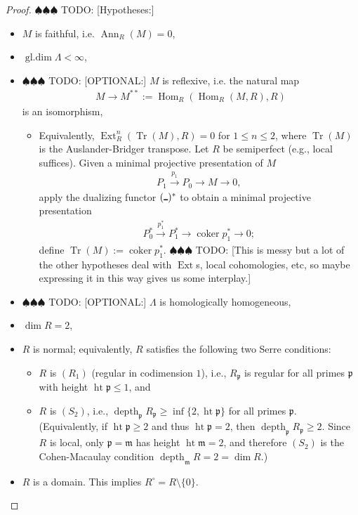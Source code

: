 \documentclass{amsart}
\theoremstyle{definition}
\def\xra{\xrightarrow}
\def\Arg{\rule{1ex}{1pt}}
\def\fm{\mathfrak{m}}
\def\fp{\mathfrak{p}}
\DeclareMathOperator{\gldim}{\operatorname{gl.dim}}
\DeclareMathOperator{\Hom}{\operatorname{Hom}}
\DeclareMathOperator{\Ann}{\operatorname{Ann}}
\DeclareMathOperator{\Ext}{\operatorname{Ext}}
\DeclareMathOperator{\coker}{\operatorname{coker}}
\DeclareMathOperator{\Tr}{\operatorname{Tr}}
\DeclareMathOperator{\depth}{\operatorname{depth}}
\DeclareMathOperator{\h}{\operatorname{ht}}
\newcommand{\todo}[1]{{\color{teal} \sf $\spadesuit\spadesuit\spadesuit$ TODO: [#1]}}
\begin{document}
\begin{proof}
\todo{Hypotheses:}
\begin{itemize}
\item $M$ is faithful, i.e. $\Ann_{R}(M)=0$,
\item $\gldim\Lambda<\infty$,
\item \todo{OPTIONAL:} $M$ is reflexive, i.e. the natural map
\begin{align*}
M\to M^{**}:=\Hom_{R}(\Hom_{R}(M,R),R)
\end{align*}
is an isomorphism,
\begin{itemize}
\item Equivalently, $\Ext_{R}^{n}(\Tr(M),R)=0$ for $1\leq n\leq2$, where $\Tr(M)$ is the Auslander-Bridger transpose. Let $R$ be semiperfect (e.g., local suffices). Given a minimal projective presentation of $M$
\begin{align*}
P_{1}\xra{p_{1}}P_{0}\to M\to0,
\end{align*}
apply the dualizing functor $(\Arg)^{*}$ to obtain a minimal projective presentation
\begin{align*}
P_{0}^{*}\xra{p_{1}^{*}}P_{1}^{*}\to\coker p_{1}^{*}\to0;
\end{align*}
define $\Tr(M):=\coker p_{1}^{*}$. \todo{This is messy but a lot of the other hypotheses deal with $\Ext$s, local cohomologies, etc, so maybe expressing it in this way gives us some interplay.}
\end{itemize}
\item \todo{OPTIONAL:} $\Lambda$ is homologically homogeneous,
\item $\dim R=2$,
\item $R$ is normal; equivalently, $R$ satisfies the following two Serre conditions: 
\begin{itemize}
\item $R$ is $(R_{1})$ (regular in codimension $1$), i.e., $R_{\fp}$ is regular for all primes $\fp$ with height $\h\fp\leq1$, and 
\item $R$ is $(S_{2})$, i.e., $\depth_{\fp}R_{\fp}\geq\inf\{2,\h\fp\}$ for all primes $\fp$. (Equivalently, if $\h\fp\geq2$ and thus $\h\fp=2$, then $\depth_{\fp}R_{\fp}\geq2$. Since $R$ is local, only $\fp=\fm$ has height $\h\fm=2$, and therefore $(S_{2})$ is the Cohen-Macaulay condition $\depth_{\fm}R=2=\dim R$.)
\end{itemize}
\item $R$ is a domain. This implies $R^{\circ}=R\setminus\{0\}$.
\end{itemize}


\end{proof}
\end{document}
